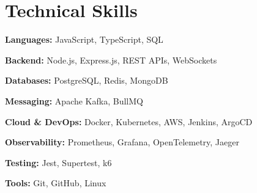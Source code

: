 \section*{Technical Skills}

\textbf{Languages:}
JavaScript, TypeScript, SQL

\medskip

\textbf{Backend:}
Node.js, Express.js, REST APIs, WebSockets

\medskip

\textbf{Databases:}
PostgreSQL, Redis, MongoDB

\medskip

\textbf{Messaging:}
Apache Kafka, BullMQ

\medskip

\textbf{Cloud \& DevOps:}
Docker, Kubernetes, AWS, Jenkins, ArgoCD

\medskip

\textbf{Observability:}
Prometheus, Grafana, OpenTelemetry, Jaeger

\medskip

\textbf{Testing:}
Jest, Supertest, k6

\medskip

\textbf{Tools:}
Git, GitHub, Linux
